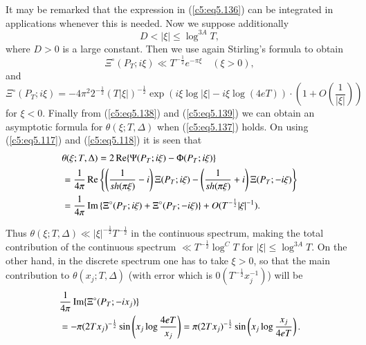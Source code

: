 It may be remarked that the expression in (\ref{c5:eq5.136}) can be
integrated in applications whenever this is needed. Now we suppose
additionally 
\begin{equation}
D < |\xi| \leq \log^{3A} T,\label{c5:eq5.137}
\end{equation}
where $D >0$ is a large constant. Then we use again Stirling's formula
to obtain 
\begin{equation}
\Xi^\circ (P_T ; i \xi) \ll T^{-\frac{1}{2}} e^{-\pi \xi} \quad (\xi > 0),\label{c5:eq5.138}
\end{equation}
and 
{\fontsize{9pt}{11pt}\selectfont
\begin{equation}
\Xi^\circ (P_T ; i \xi) = - 4 \pi^2 2^{-\frac{1}{2}}( T
|\xi|)^{-\frac{1}{2}} \exp (i \xi \log |\xi| - i \xi \log (4 eT))
\cdot \left(1+O \left(\frac{1}{|\xi|} \right) \right)\label{c5:eq5.139}
\end{equation}}
for $\xi < 0$. Finally from (\ref{c5:eq5.138}) and (\ref{c5:eq5.139})
we can obtain an asymptotic formula for $\theta (\xi; T,\Delta)$ when
(\ref{c5:eq5.137}) holds. On using (\ref{c5:eq5.117}) and
(\ref{c5:eq5.118}) it is seen that  
\begin{align}
& \theta (\xi;T,\Delta) = 2 \operatorname{Re} \{\Psi (P_T;i\xi) - \Phi (P_T; i
  \xi)\}\label{c5:eq5.140}\\ 
& = \frac{1}{4\pi} \operatorname{Re} \left\{ \left( \frac{1}{sh (\pi \xi)} - i
  \right) \Xi (P_T ; i \xi) - \left(\frac{1}{sh (\pi \xi)} + i \right)
  \Xi (P_T; - i\xi)\right\}\notag\\ 
& = \frac{1}{4 \pi} \operatorname{Im} \left\{ \Xi^\circ (P_T ; i \xi) + \Xi^\circ
  (P_T;-i\xi) \right\} + O (T^{-\frac{1}{2}} |\xi|^{-1}).\notag  
\end{align}\pageoriginale

Thus $\theta (\xi;T,\Delta) \ll |\xi|^{-\frac{1}{2}} T^{-\frac{1}{2}}$
in the continuous spectrum, making the total contribution of the
continuous spectrum $\ll T^{-\frac{1}{2}} \log^C T$ for $|\xi| \leq
\log^{3A} T$. On the other hand, in the discrete spectrum one has to
take $\xi > 0$, so that the main contribution to $\theta (x_j;
T,\Delta)$ (with error which is $0(T^{-\frac{1}{2}} x^{-1}_j)$) will
be 
\begin{align*}
& \frac{1}{4\pi} \operatorname{Im} \{\Xi^\circ (P_T;- i x_j)\}\\
& = - \pi (2 T x_j)^{-\frac{1}{2}} \sin \left(x_j \log \frac{4eT}{x_j}
  \right) = \pi (2T x_j)^{-\frac{1}{2}} \sin \left( x_j \log
  \frac{x_j}{4 eT}\right). 
\end{align*}

